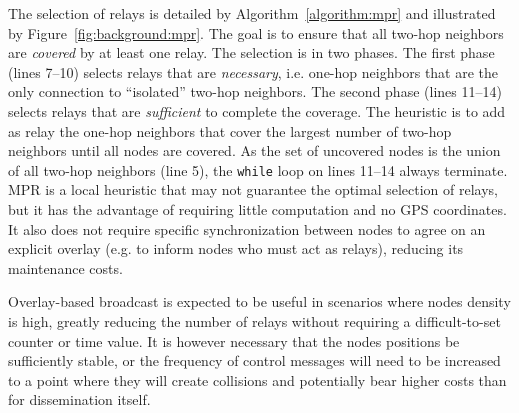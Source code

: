 The selection of relays is detailed by Algorithm~\ref{algorithm:mpr} and illustrated by Figure~\ref{fig:background:mpr}.
The goal is to ensure that all two-hop neighbors are \emph{covered} by at least one relay.
The selection is in two phases.
The first phase (lines 7--10) selects relays that are \emph{necessary}, i.e. one-hop neighbors that are the only connection to ``isolated'' two-hop neighbors.
The second phase (lines 11--14) selects relays that are \emph{sufficient} to complete the coverage.
The heuristic is to add as relay the one-hop neighbors that cover the largest number of two-hop neighbors until all nodes are covered.
As the set of uncovered nodes is the union of all two-hop neighbors (line 5), the \texttt{while} loop on lines 11--14 always terminate.
MPR is a local heuristic that may not guarantee the optimal selection of relays, but it has the advantage of requiring little computation and no GPS coordinates.
It also does not require specific synchronization between nodes to agree on an explicit overlay (e.g. to inform nodes who must act as relays), reducing its maintenance costs.

Overlay-based broadcast is expected to be useful in scenarios where nodes density is high, greatly reducing the number of relays without requiring a difficult-to-set counter or time value.
It is however necessary that the nodes positions be sufficiently stable, or the frequency of control messages will need to be increased to a point where they will create collisions and potentially bear higher costs than for dissemination itself.

